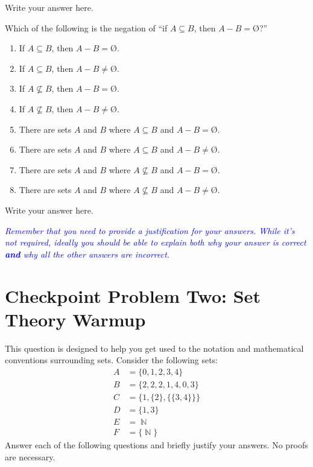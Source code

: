\documentclass{article}
\renewcommand{\(}{\left(}
\renewcommand{\)}{\right)}
\DeclareMathOperator{\N}{\mathbb{N}}
\renewcommand{\emptyset}{\text{\O}}
\theoremstyle{plain}
\theoremstyle{plain}
\theoremstyle{definition}
\begin{document}
\begin{shaded}
Write your answer here.
\end{shaded}

Which of the following is the negation of ``if $A \subseteq B$, then $A - B = \emptyset$?''

\begin{enumerate}[label=\Alph*)]
    \item If $A \subseteq B$, then $A - B = \emptyset$.
    \item If $A \subseteq B$, then $A - B \neq \emptyset$.
    \item If $A \not\subseteq B$, then $A - B = \emptyset$.
    \item If $A \not\subseteq B$, then $A - B \neq \emptyset$.
    \item There are sets $A$ and $B$ where $A \subseteq B$ and $A - B = \emptyset$.
    \item There are sets $A$ and $B$ where $A \subseteq B$ and $A - B \neq \emptyset$.
    \item There are sets $A$ and $B$ where $A \not\subseteq B$ and $A - B = \emptyset$.
    \item There are sets $A$ and $B$ where $A \not\subseteq B$ and $A - B \neq \emptyset$.
\end{enumerate}

\begin{shaded}
Write your answer here.
\end{shaded}

\textit{\textcolor{blue}{Remember that you need to provide a justification for your answers. While it's not required, ideally you should be able to explain both why your answer is correct \textbf{and} why all the other answers are incorrect.}}

\section*{Checkpoint Problem Two: Set Theory Warmup}

This question is designed to help you get used to the notation and mathematical
conventions surrounding sets.
Consider the following sets:
\begin{align*}
A &= \{0, 1, 2, 3, 4\} \\
B &= \{2, 2, 2, 1, 4, 0, 3\} \\
C &= \{1, \{2\}, \{\{3, 4\}\}\} \\
D &= \{1, 3\} \\
E &= \N \\
F &= \{\N\}
\end{align*}
Answer each of the following questions and briefly justify your answers.
No proofs are necessary.
\end{document}
